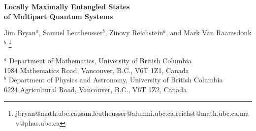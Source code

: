 \documentclass[12pt]{article}
\theoremstyle{definition}
\begin{document}
\begin{titlepage}
\hfill
\vbox{
    \halign{#\hfil         \cr
           } %
      }  %
\vspace*{20mm}
\begin{center}
{\Large \bf Locally Maximally Entangled States \\ of Multipart Quantum Systems}

\vspace*{15mm}
\vspace*{1mm}
Jim Bryan$^a$, Samuel Leutheusser$^b$, Zinovy Reichstein$^a$, and Mark Van Raamsdonk$^b$
\vspace*{1cm}
\let\thefootnote\relax\footnote{jbryan@math.ubc.ca,sam.leutheusser@alumni.ubc.ca,reichst@math.ubc.ca,mav@phas.ubc.ca}

{${}^{a}$ Department of Mathematics,
University of British Columbia\\
1984 Mathematics Road,
Vancouver, B.C., V6T 1Z1, Canada\\
${}^{b}$ Department of Physics and Astronomy,
University of British Columbia\\
6224 Agricultural Road,
Vancouver, B.C., V6T 1Z2, Canada}

\vspace*{1cm}
\end{center}
\begin{abstract}

For a multipart quantum system, a locally maximally entangled (LME)
state is one where each elementary subsystem is maximally entangled
with its complement, i.e. the reduced density matrix for each
elementary subsystem is a multiple of the identity matrix. In this
paper, we provide a complete answer for which multipart systems admit
LME states by giving necessary and sufficient conditions on the
subsystem dimensions $(d_1, d_2, \dots, d_n)$. When the space of such
states is not empty, its quotient by local unitary transformations is
a K\"ahler manifold that can be described as an algebraic variety in
weighted projective space; we provide a general result for the
dimension of this space, which is also equivalent to the full space of
quantum states with ``generic'' entanglement up to SLOCC
equivalence. We provide a general construction for a special class of
``stabilizer'' LME states based on the following observation: for any
finite or compact group $H$ acting irreducibly on each subsystem,
states invariant under $H$ up to a phase are LME. Finally, for a
tripartite system with subsystems of dimensions $(2,A,B)$, we give an
explicit construction of all LME states.
\end{abstract}

\end{titlepage}
\end{document}
